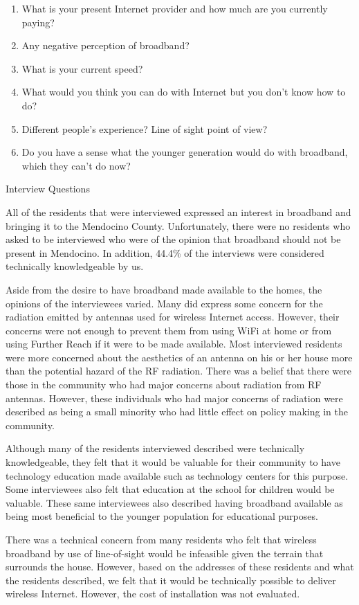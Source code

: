 \begin{table}
\begin{enumerate}
    \item What is your present Internet provider and how much are you currently paying?
    \item Any negative perception of broadband?
    \item What is your current speed?
    \item What would you think you can do with Internet but you don’t know how to do?
    \item Different people’s experience? Line of sight point of view?
    \item Do you have a sense what the younger generation would do with broadband, which they can’t do now?
\end{enumerate}
\caption{Interview Questions}
\label{tab:questions}
\end{table}

All of the residents that were interviewed expressed an interest in broadband and bringing it
to the Mendocino County. Unfortunately, there were no residents who asked to be interviewed who
were of the opinion that broadband should not be present in Mendocino. In addition, 44.4\% of
the interviews were considered technically knowledgeable by us.

Aside from the desire to have broadband made available to the homes, the opinions of the
interviewees varied. Many did express some concern for the radiation emitted by antennas
used for wireless Internet access. However, their concerns were not enough to prevent them
from using WiFi at home or from using Further Reach if it were to be made available.
Most interviewed residents were more concerned about the aesthetics of an antenna on his or her
house more than the potential hazard of the RF radiation.
There was a belief that there were those in the community who had major concerns about radiation
from RF antennas. However, these individuals who had major concerns of radiation were described
as being a small minority who had little effect on policy making in the community.

Although many of the residents interviewed described were technically knowledgeable, they felt
that it would be valuable for their community to have technology education made available such
as technology centers for this purpose. Some interviewees also felt that education at the school
for children would be valuable. These same interviewees also described having broadband available
as being most beneficial to the younger population for educational purposes.

There was a technical concern from many residents who felt that wireless broadband by use of
line-of-sight would be infeasible given the terrain that surrounds the house. However, based
on the addresses of these residents and what the residents described, we felt
that it would be technically possible to deliver wireless Internet. However, the cost of
installation was not evaluated.

